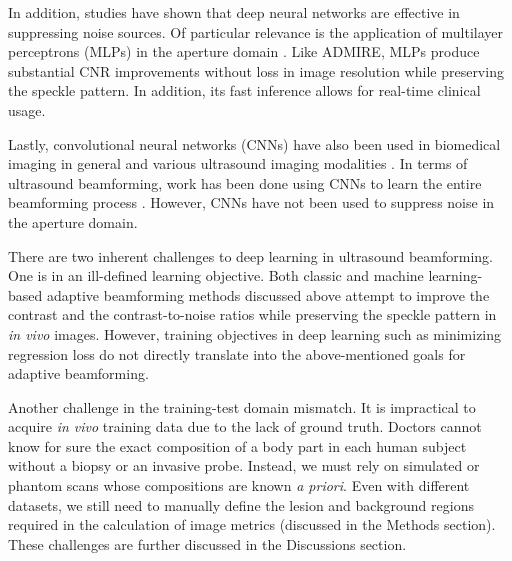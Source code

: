 In addition, studies have shown that deep neural networks are effective in suppressing noise sources. Of particular relevance is the application of multilayer perceptrons (MLPs) in the aperture domain \cite{luchies_tmi_2018, training_improvements}. Like ADMIRE, MLPs produce substantial CNR improvements without loss in image resolution while preserving the speckle pattern. In addition, its fast inference allows for real-time clinical usage.

Lastly, convolutional neural networks (CNNs) have also been used in biomedical imaging in general \cite{unet} and various ultrasound imaging modalities \cite{van_sloun_review}. In terms of ultrasound beamforming, work has been done using CNNs to learn the entire beamforming process \cite{hyun_uffc_2019}. However, CNNs have not been used to suppress noise in the aperture domain.

There are two inherent challenges to deep learning in ultrasound beamforming. One is in an ill-defined learning objective. Both classic and machine learning-based adaptive beamforming methods discussed above attempt to improve the contrast and the contrast-to-noise ratios while preserving the speckle pattern in \textit{in vivo} images. However, training objectives in deep learning such as minimizing regression loss do not directly translate into the above-mentioned goals for adaptive beamforming.

Another challenge in the training-test domain mismatch. It is impractical to acquire \textit{in vivo} training data due to the lack of ground truth. Doctors cannot know for sure the exact composition of a body part in each human subject without a biopsy or an invasive probe. Instead, we must rely on simulated or phantom scans whose compositions are known \textit{a priori}. Even with different datasets, we still need to manually define the lesion and background regions required in the calculation of image metrics (discussed in the Methods section). These challenges are further discussed in the Discussions section.


